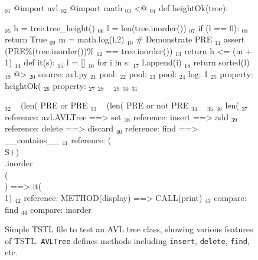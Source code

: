 \documentclass{sig-alternate}
\begin{document}
\begin{figure}
\begin{code}
$_{01}$ @import avl
$_{02}$ @import math
\vspace{0.1in}
$_{03}$ <@
$_{04}$ def heightOk(tree):

$_{05}$     h = tree.tree\_height()
$_{06}$     l = len(tree.inorder())
$_{07}$     if (l == 0):
$_{08}$        return True
$_{09}$     m = math.log(l,2)
$_{10}$     \# Demonstrate PRE
$_{11}$     assert (PRE\%(tree.inorder())\% 
$_{12}$             == tree.inorder())
$_{13}$     return h <= (m + 1)
\vspace{0.1in}
$_{14}$ def it(s):
$_{15}$     l = []
$_{16}$     for i in s:
$_{17}$        l.append(i)
$_{18}$     return sorted(l)
$_{19}$ @>
\vspace{0.1in}
$_{20}$ source: avl.py
\vspace{0.1in}
$_{21}$ pool: %
$_{22}$ pool: %
$_{23}$ pool: %
\vspace{0.1in}
$_{24}$ log: 1 %
\vspace{0.1in}
$_{25}$ property: heightOk(%
$_{26}$ property: %
\vspace{0.1in}
$_{27}$ %
$_{28}$ ~%
$_{29}$ %
\vspace{0.1in}
$_{30}$ %
$_{31}$ %
\vspace{0.1in}

$_{32}$ ~%
   (len(%
      PRE%
   or PRE%
$_{33}$ ~%
   (len(%
      PRE%
   or not PRE%
$_{34}$ ~%
$_{35}$ %
$_{36}$ len(%
\vspace{0.1in}
$_{37}$ reference: avl.AVLTree ==> set
$_{38}$ reference: insert ==> add
$_{39}$ reference: delete ==> discard
$_{40}$ reference: find ==> \_\_contains\_\_
$_{41}$ reference: (\\S+)\\.inorder\\(\\) ==> it(\\1)
$_{42}$ reference: METHOD(display) ==> CALL(print)
\vspace{0.1in}
$_{43}$ compare: find
$_{44}$ compare: inorder
\end{code}
\caption{Simple TSTL file to test an AVL tree class,
  showing various features of TSTL.  {\tt AVLTree} defines methods
  including {\tt insert}, {\tt delete}, {\tt find}, etc.}
\label{fig:avl}
\end{figure}
\end{document}
